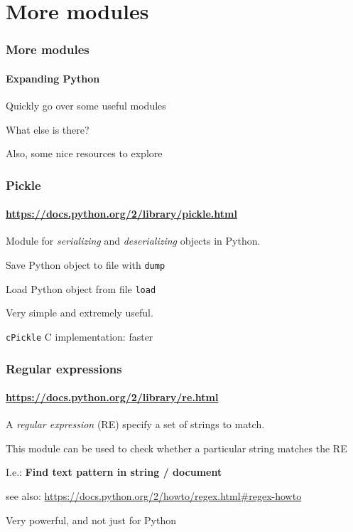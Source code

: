 \section{More modules} %
\label{sec:more_modules}

    \begin{frame}\frametitle{More modules}
        \framesubtitle{Expanding Python}

        Quickly go over some useful modules

        \vfill

        What else is there?

        \vfill

        Also, some nice resources to explore

    \end{frame}

    \begin{frame}\frametitle{Pickle}
        \framesubtitle{\url{https://docs.python.org/2/library/pickle.html}}

        Module for \emph{serializing} and \emph{deserializing} objects in
        Python.

        \vfill

        Save Python object to file with \texttt{dump}

        Load Python object from file \texttt{load}

        \vfill

        Very simple and extremely useful.

        \vfill\pause

        \texttt{cPickle} C implementation: faster

    \end{frame}

    \begin{frame}\frametitle{Regular expressions}
        \framesubtitle{\url{https://docs.python.org/2/library/re.html}}

    A \emph{regular expression} (RE) specify a set of strings to match.

    This module can be used to check whether a particular string matches the RE

    \vfill

    I.e.: \textbf{Find text pattern in string / document}

    \vfill

    see also: \url{https://docs.python.org/2/howto/regex.html\#regex-howto}

    \vfill

    Very powerful, and not just for Python

    \end{frame}

